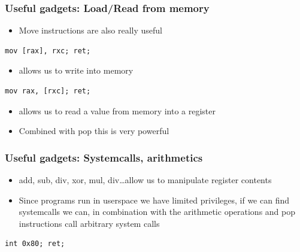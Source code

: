 \documentclass[11pt]{beamer}
\begin{document}
\begin{frame}[fragile]
    \frametitle{Useful gadgets: Load/Read from memory}
    \begin{itemize}
        \item Move instructions are also really useful
    \end{itemize}
\begin{lstlisting}[style=result]
mov [rax], rxc; ret;
\end{lstlisting}
    \begin{itemize}
        \item allows us to write into memory
    \end{itemize}
\begin{lstlisting}[style=result]
mov rax, [rxc]; ret;
\end{lstlisting}
    \begin{itemize}
        \item allows us to read a value from memory into a register
        \item Combined with pop this is very powerful
    \end{itemize}
\end{frame}

\begin{frame}[fragile]
    \frametitle{Useful gadgets: Systemcalls, arithmetics}
    \begin{itemize}
        \item add, sub, div, xor, mul, div\ldots allow us to manipulate register contents
        \item Since programs run in userspace we have limited privileges, if we can find systemcalls we can, in combination with the arithmetic operations and pop instructions call arbitrary system calls
    \end{itemize}
\begin{lstlisting}[style=result]
int 0x80; ret;
\end{lstlisting}
\end{frame}
\end{document}
